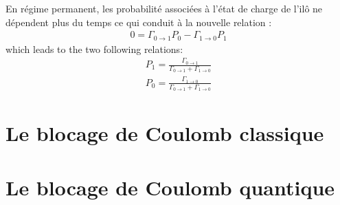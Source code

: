 En régime permanent, les probabilité associées à l'état de charge de l'il\^o ne dépendent plus du temps ce qui conduit à la nouvelle relation :
\begin{eqnarray}
0 = \Gamma_{0 \rightarrow 1}P_0 - \Gamma_{1 \rightarrow 0}P_1
\end{eqnarray}
which leads to the two following relations:
\begin{eqnarray}
P_1 = \frac{\Gamma_{0 \rightarrow 1}}{\Gamma_{0 \rightarrow 1} + \Gamma_{1 \rightarrow 0}} \\
P_0 = \frac{\Gamma_{1 \rightarrow 0}}{\Gamma_{0 \rightarrow 1} + \Gamma_{1 \rightarrow 0}} 
\end{eqnarray}


 
\section{Le blocage de Coulomb classique}

\section{Le blocage de Coulomb quantique}

